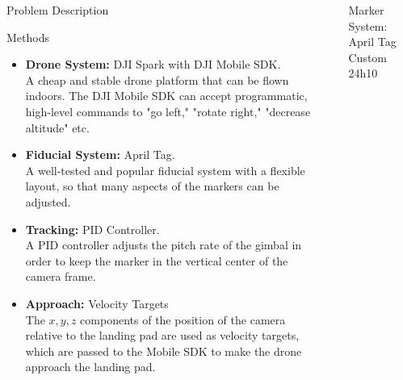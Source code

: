 \documentclass[final, 20pt]{beamer}
\newlength{\sepwidth}
\newlength{\colwidth}
\newcommand{\separatorcolumn}{\begin{column}{\sepwidth}\end{column}}
\begin{document}
\begin{frame}[t]
\begin{columns}[t]
\begin{column}{\colwidth}
\begin{alertblock}{Problem Description}
  \end{alertblock}

  \begin{block}{Methods}

    \begin{itemize}
      \item \textbf{Drone System:} DJI Spark with DJI Mobile SDK.\\A cheap and stable drone platform that can be flown indoors.
                    The DJI Mobile SDK can accept programmatic, high-level commands to "go left," "rotate right," "decrease altitude" etc.
      \item \textbf{Fiducial System:} April Tag.\\A well-tested and popular fiducial system with a flexible layout,
                    so that many aspects of the markers can be adjusted.
      \item \textbf{Tracking:} PID Controller.\\A PID controller adjusts the pitch rate of the gimbal
                    in order to keep the marker in the vertical center of the camera frame.
      \item \textbf{Approach:} Velocity Targets\\The $x,y,z$ components of the position of the camera
                    relative to the landing pad are used as velocity targets, which are passed to the Mobile SDK to make the drone approach the landing pad.
    \end{itemize}

  \end{block}

\end{column}

\separatorcolumn

\begin{column}{\colwidth}

  \begin{block}{Marker System: April Tag Custom 24h10}


\end{block}
\end{column}
\end{columns}
\end{frame}
\end{document}
